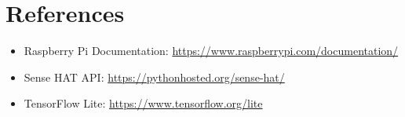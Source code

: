 \documentclass[12pt,a4paper]{article}
\begin{document}
\section{References}
\begin{itemize}
    \item Raspberry Pi Documentation: \url{https://www.raspberrypi.com/documentation/}
    \item Sense HAT API: \url{https://pythonhosted.org/sense-hat/}
    \item TensorFlow Lite: \url{https://www.tensorflow.org/lite}
\end{itemize}
\end{document}
